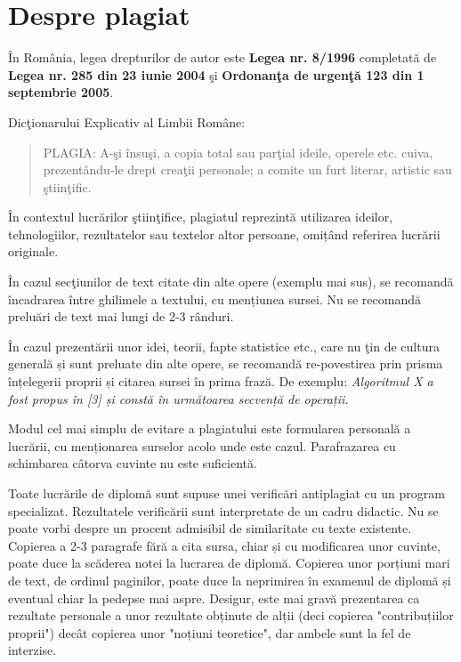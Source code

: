 \chapter{Despre plagiat}
\label{chap:div}


În România, legea drepturilor de autor este \textbf{Legea nr. 8/1996} completată de \textbf{Legea nr. 285 din 23 iunie 2004} şi \textbf{Ordonanţa de urgenţă 123 din 1 septembrie 2005}.

 Dicţionarului Explicativ al Limbii Române:

\blockquote{PLAGIA: A-şi însuşi, a copia total sau parţial ideile, operele etc. cuiva, prezentându-le drept creaţii personale; a comite un furt literar, artistic sau ştiinţific.}

În contextul lucrărilor ştiinţifice, plagiatul reprezintă utilizarea ideilor, tehnologiilor, rezultatelor sau textelor altor persoane, omițând referirea lucrării originale.

În cazul secţiunilor de text citate din alte opere (exemplu mai sus), se recomandă încadrarea între ghilimele a textului, cu mențiunea sursei. Nu se recomandă preluări de text mai lungi de 2-3 rânduri.

În cazul prezentării unor idei, teorii, fapte statistice etc., care nu ţin de cultura generală și sunt preluate din alte opere, se recomandă re-povestirea prin prisma înțelegerii proprii și citarea sursei în prima frază. De exemplu: {\em Algoritmul X a fost propus în [3] și constă în următoarea secvență de operații.}

Modul cel mai simplu de evitare a plagiatului este formularea personală a lucrării, cu menționarea surselor acolo unde este cazul. Parafrazarea cu schimbarea câtorva cuvinte nu este suficientă.

Toate lucrările de diplomă sunt supuse unei verificări antiplagiat cu un program specializat. Rezultatele verificării sunt interpretate de un cadru didactic. Nu se poate vorbi despre un procent admisibil de similaritate cu texte existente. Copierea a 2-3 paragrafe fără a cita sursa, chiar și cu modificarea unor cuvinte, poate duce la scăderea notei la lucrarea de diplomă. Copierea unor porțiuni mari de text, de ordinul paginilor, poate duce la neprimirea în examenul de diplomă și eventual chiar la pedepse mai aspre. Desigur, este mai gravă prezentarea ca rezultate personale a unor rezultate obținute de alții (deci copierea "contribuțiilor proprii") decât copierea unor "noțiuni teoretice", dar ambele sunt la fel de interzise.


